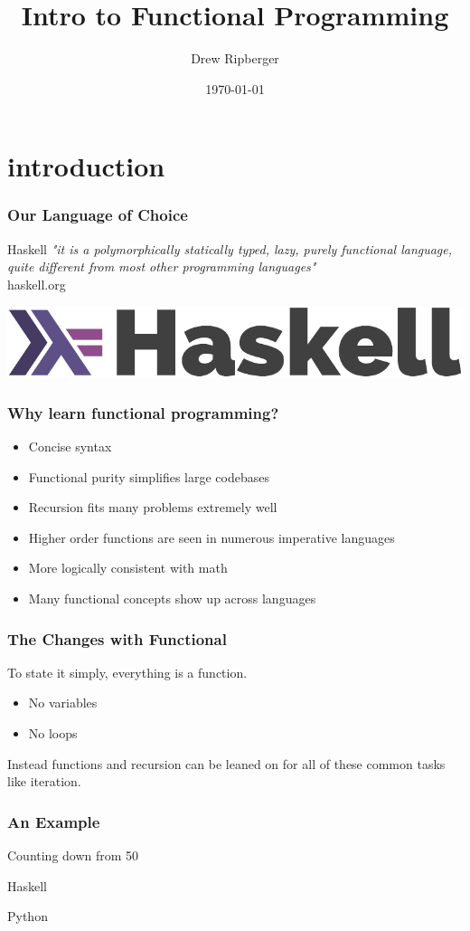 \documentclass{beamer}
\title{Intro to Functional Programming}
\author{Drew Ripberger}
\date{\today}
\begin{document}
\frame{\titlepage}

\section{introduction}

\begin{frame}
  \frametitle{Our Language of Choice}
  \begin{block}{Haskell}
    \textit{"it is a polymorphically statically typed, lazy, purely functional language, quite different from most other programming languages"}
    \\
    \alert{haskell.org}
  \end{block}
  \vspace{1cm}
  \includegraphics[width=.5\linewidth]{haskell-logo.pdf}
  \centering
\end{frame}


\begin{frame}
  \frametitle{Why learn functional programming?}
  \begin{itemize}
  \item Concise syntax
  \item Functional purity simplifies large codebases
  \item Recursion fits many problems extremely well
  \item Higher order functions are seen in numerous imperative languages
  \item More logically consistent with math
  \item Many functional concepts show up across languages
  \end{itemize}
\end{frame}

\begin{frame}
  \frametitle{The Changes with Functional}
  To state it simply, everything is a function.
  \begin{itemize}
  \item No variables
  \item No loops
  \end{itemize}
  Instead functions and recursion can be leaned on for all of these common tasks like iteration.
\end{frame}

\begin{frame}
  \frametitle{An Example}
  Counting down from 50
  \begin{block}{Haskell}
    
  \end{block}
  \begin{block}{Python}
    
  \end{block}
\end{frame}
\end{document}
